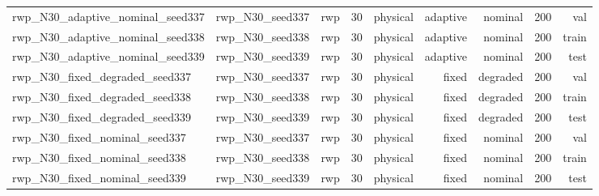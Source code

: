\begin{tabular}{lrrrrrrrr}
rwp\_N30\_adaptive\_nominal\_seed337 & rwp\_N30\_seed337 & rwp & 30 & physical & adaptive & nominal & 200 & val \\
rwp\_N30\_adaptive\_nominal\_seed338 & rwp\_N30\_seed338 & rwp & 30 & physical & adaptive & nominal & 200 & train \\
rwp\_N30\_adaptive\_nominal\_seed339 & rwp\_N30\_seed339 & rwp & 30 & physical & adaptive & nominal & 200 & test \\
rwp\_N30\_fixed\_degraded\_seed337 & rwp\_N30\_seed337 & rwp & 30 & physical & fixed & degraded & 200 & val \\
rwp\_N30\_fixed\_degraded\_seed338 & rwp\_N30\_seed338 & rwp & 30 & physical & fixed & degraded & 200 & train \\
rwp\_N30\_fixed\_degraded\_seed339 & rwp\_N30\_seed339 & rwp & 30 & physical & fixed & degraded & 200 & test \\
rwp\_N30\_fixed\_nominal\_seed337 & rwp\_N30\_seed337 & rwp & 30 & physical & fixed & nominal & 200 & val \\
rwp\_N30\_fixed\_nominal\_seed338 & rwp\_N30\_seed338 & rwp & 30 & physical & fixed & nominal & 200 & train \\
rwp\_N30\_fixed\_nominal\_seed339 & rwp\_N30\_seed339 & rwp & 30 & physical & fixed & nominal & 200 & test \\
\bottomrule
\end{tabular}